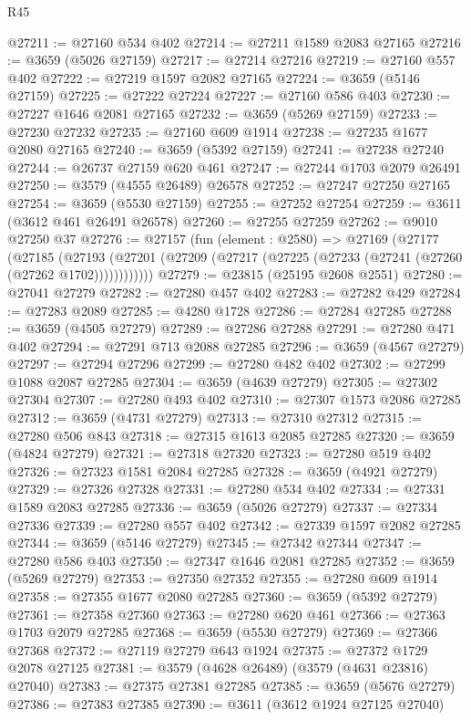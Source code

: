 \begin{lexlean}{R45}
\begin{coremodule}
@27211 := @27160 @534 @402
@27214 := @27211 @1589 @2083 @27165
@27216 := @3659 (@5026 @27159)
@27217 := @27214 @27216
@27219 := @27160 @557 @402
@27222 := @27219 @1597 @2082 @27165
@27224 := @3659 (@5146 @27159)
@27225 := @27222 @27224
@27227 := @27160 @586 @403
@27230 := @27227 @1646 @2081 @27165
@27232 := @3659 (@5269 @27159)
@27233 := @27230 @27232
@27235 := @27160 @609 @1914
@27238 := @27235 @1677 @2080 @27165
@27240 := @3659 (@5392 @27159)
@27241 := @27238 @27240
@27244 := @26737 @27159 @620 @461
@27247 := @27244 @1703 @2079 @26491
@27250 := @3579 (@4555 @26489) @26578
@27252 := @27247 @27250 @27165
@27254 := @3659 (@5530 @27159)
@27255 := @27252 @27254
@27259 := @3611 (@3612 @461 @26491 @26578)
@27260 := @27255 @27259
@27262 := @9010 @27250 @37
@27276 := @27157
    (fun (element : @2580) =>
    @27169
      (@27177
        (@27185
          (@27193 (@27201 (@27209 (@27217 (@27225 (@27233 (@27241 (@27260 (@27262 @1702))))))))))))
@27279 := @23815 (@25195 @2608 @2551)
@27280 := @27041 @27279
@27282 := @27280 @457 @402
@27283 := @27282 @429
@27284 := @27283 @2089
@27285 := @4280 @1728
@27286 := @27284 @27285
@27288 := @3659 (@4505 @27279)
@27289 := @27286 @27288
@27291 := @27280 @471 @402
@27294 := @27291 @713 @2088 @27285
@27296 := @3659 (@4567 @27279)
@27297 := @27294 @27296
@27299 := @27280 @482 @402
@27302 := @27299 @1088 @2087 @27285
@27304 := @3659 (@4639 @27279)
@27305 := @27302 @27304
@27307 := @27280 @493 @402
@27310 := @27307 @1573 @2086 @27285
@27312 := @3659 (@4731 @27279)
@27313 := @27310 @27312
@27315 := @27280 @506 @843
@27318 := @27315 @1613 @2085 @27285
@27320 := @3659 (@4824 @27279)
@27321 := @27318 @27320
@27323 := @27280 @519 @402
@27326 := @27323 @1581 @2084 @27285
@27328 := @3659 (@4921 @27279)
@27329 := @27326 @27328
@27331 := @27280 @534 @402
@27334 := @27331 @1589 @2083 @27285
@27336 := @3659 (@5026 @27279)
@27337 := @27334 @27336
@27339 := @27280 @557 @402
@27342 := @27339 @1597 @2082 @27285
@27344 := @3659 (@5146 @27279)
@27345 := @27342 @27344
@27347 := @27280 @586 @403
@27350 := @27347 @1646 @2081 @27285
@27352 := @3659 (@5269 @27279)
@27353 := @27350 @27352
@27355 := @27280 @609 @1914
@27358 := @27355 @1677 @2080 @27285
@27360 := @3659 (@5392 @27279)
@27361 := @27358 @27360
@27363 := @27280 @620 @461
@27366 := @27363 @1703 @2079 @27285
@27368 := @3659 (@5530 @27279)
@27369 := @27366 @27368
@27372 := @27119 @27279 @643 @1924
@27375 := @27372 @1729 @2078 @27125
@27381 := @3579 (@4628 @26489) (@3579 (@4631 @23816) @27040)
@27383 := @27375 @27381 @27285
@27385 := @3659 (@5676 @27279)
@27386 := @27383 @27385
@27390 := @3611 (@3612 @1924 @27125 @27040)

\end{coremodule}
\end{lexlean}
